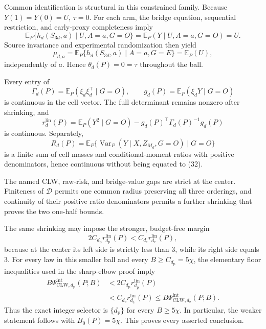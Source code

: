 Common identification is structural in this constrained family.  Because \(Y(1)=Y(0)=U\), \(\tau=0\).  For each arm, the bridge equation, sequential restriction, and early-proxy completeness imply
\[
 \mathbb E_P\{h_d(S_{3d},a)\mid U,A=a,G=O\}
 =\mathbb E_P(Y\mid U,A=a,G=O)=U.
\]
Source invariance and experimental randomization then yield
\[
 \mu_{d,a}
 =\mathbb E_P\{h_d(S_{3d},a)\mid A=a,G=E\}
 =\mathbb E_P(U),
\]
independently of \(a\).  Hence \(\theta_d(P)=0=\tau\) throughout the ball.

Every entry of
\[
 \Gamma_d(P)=\mathbb E_P(\xi_d\xi_d^\top\mid G=O),
 \qquad g_d(P)=\mathbb E_P(\xi_dY\mid G=O)
\]
is continuous in the cell vector.  The full determinant remains nonzero after shrinking, and
\[
 r_d^{\mathrm{lin}}(P)=
 \mathbb E_P(Y^2\mid G=O)
 -g_d(P)^\top\Gamma_d(P)^{-1}g_d(P)                       \tag{32}
\]
is continuous.  Separately,
\[
 R_d(P)=\mathbb E_P\{\operatorname{Var}_P(Y\mid X,Z_{M_d},G=O)\mid G=O\}
\]
is a finite sum of cell masses and conditional-moment ratios with positive denominators, hence continuous without being equated to (32).

The named CLW, raw-risk, and bridge-value gaps are strict at the center.  Finiteness of \(\mathcal D\) permits one common radius preserving all three orderings, and continuity of their positive ratio denominators permits a further shrinking that proves the two one-half bounds.

The same shrinking may impose the stronger, budget-free margin
\[
 2C_{d_{\mathrm p}}r_{d_{\mathrm p}}^{\mathrm{lin}}(P)
 <C_{d_{\mathrm e}}r_{d_{\mathrm e}}^{\mathrm{lin}}(P),   \tag{33}
\]
because at the center its left side is strictly less than \(3\), while its right side equals \(3\).  For every law in this smaller ball and every \(B\ge C_{d_{\mathrm p}}=5\chi\), the elementary floor inequalities used in the sharp-elbow proof imply
\[
\begin{aligned}
 B\Psi_{\mathrm{CLW},d_{\mathrm p}}^{\mathrm{int}}(P;B)
 &<2C_{d_{\mathrm p}}r_{d_{\mathrm p}}^{\mathrm{lin}}(P)\\
 &<C_{d_{\mathrm e}}r_{d_{\mathrm e}}^{\mathrm{lin}}(P)
 \le B\Psi_{\mathrm{CLW},d_{\mathrm e}}^{\mathrm{int}}(P;B).
\end{aligned}                                               \tag{34}
\]
Thus the exact integer selector is \(\{d_{\mathrm p}\}\) for every \(B\ge5\chi\).  In particular, the weaker statement follows with \(B_0(P)=5\chi\).  This proves every asserted conclusion.

